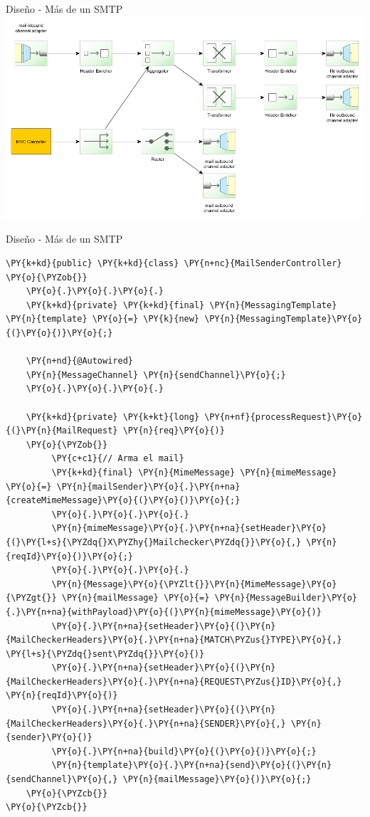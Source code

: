 \documentclass{beamer}
\begin{document}
\begin{frame}{Diseño - Más de un SMTP}
\includegraphics[width=1.0\linewidth]{sp-int-13}
\end{frame}

\begin{frame}[fragile]{Diseño - Más de un SMTP}
\begin{Verbatim}[fontsize=\tiny,commandchars=\\\{\}]
\PY{k+kd}{public} \PY{k+kd}{class} \PY{n+nc}{MailSenderController}
\PY{o}{\PYZob{}}
    \PY{o}{.}\PY{o}{.}\PY{o}{.}
    \PY{k+kd}{private} \PY{k+kd}{final} \PY{n}{MessagingTemplate} \PY{n}{template} \PY{o}{=} \PY{k}{new} \PY{n}{MessagingTemplate}\PY{o}{(}\PY{o}{)}\PY{o}{;}

    \PY{n+nd}{@Autowired}
    \PY{n}{MessageChannel} \PY{n}{sendChannel}\PY{o}{;}
    \PY{o}{.}\PY{o}{.}\PY{o}{.}

    \PY{k+kd}{private} \PY{k+kt}{long} \PY{n+nf}{processRequest}\PY{o}{(}\PY{n}{MailRequest} \PY{n}{req}\PY{o}{)}
    \PY{o}{\PYZob{}}
         \PY{c+c1}{// Arma el mail}
         \PY{k+kd}{final} \PY{n}{MimeMessage} \PY{n}{mimeMessage} \PY{o}{=} \PY{n}{mailSender}\PY{o}{.}\PY{n+na}{createMimeMessage}\PY{o}{(}\PY{o}{)}\PY{o}{;}
         \PY{o}{.}\PY{o}{.}\PY{o}{.}
         \PY{n}{mimeMessage}\PY{o}{.}\PY{n+na}{setHeader}\PY{o}{(}\PY{l+s}{\PYZdq{}X\PYZhy{}Mailchecker\PYZdq{}}\PY{o}{,} \PY{n}{reqId}\PY{o}{)}\PY{o}{;}
         \PY{o}{.}\PY{o}{.}\PY{o}{.}
         \PY{n}{Message}\PY{o}{\PYZlt{}}\PY{n}{MimeMessage}\PY{o}{\PYZgt{}} \PY{n}{mailMessage} \PY{o}{=} \PY{n}{MessageBuilder}\PY{o}{.}\PY{n+na}{withPayload}\PY{o}{(}\PY{n}{mimeMessage}\PY{o}{)}
         \PY{o}{.}\PY{n+na}{setHeader}\PY{o}{(}\PY{n}{MailCheckerHeaders}\PY{o}{.}\PY{n+na}{MATCH\PYZus{}TYPE}\PY{o}{,} \PY{l+s}{\PYZdq{}sent\PYZdq{}}\PY{o}{)}
         \PY{o}{.}\PY{n+na}{setHeader}\PY{o}{(}\PY{n}{MailCheckerHeaders}\PY{o}{.}\PY{n+na}{REQUEST\PYZus{}ID}\PY{o}{,} \PY{n}{reqId}\PY{o}{)}
         \PY{o}{.}\PY{n+na}{setHeader}\PY{o}{(}\PY{n}{MailCheckerHeaders}\PY{o}{.}\PY{n+na}{SENDER}\PY{o}{,} \PY{n}{sender}\PY{o}{)}
         \PY{o}{.}\PY{n+na}{build}\PY{o}{(}\PY{o}{)}\PY{o}{;}
         \PY{n}{template}\PY{o}{.}\PY{n+na}{send}\PY{o}{(}\PY{n}{sendChannel}\PY{o}{,} \PY{n}{mailMessage}\PY{o}{)}\PY{o}{;}
    \PY{o}{\PYZcb{}}
\PY{o}{\PYZcb{}}
\end{Verbatim}
\end{frame}
\end{document}
